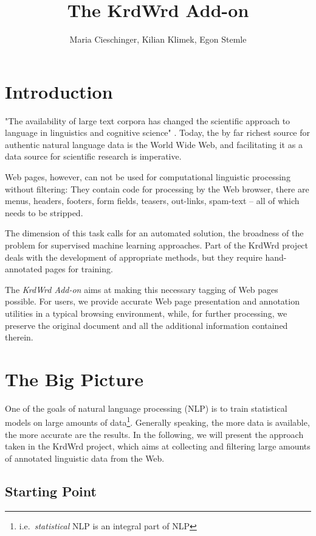 \documentclass[12pt]{article}
\title{The KrdWrd Add-on}
\author{Maria Cieschinger, Kilian Klimek, Egon Stemle}
\begin{document}
\maketitle


\section{Introduction}

"The availability of large text corpora has changed the scientific approach to language in linguistics and cognitive science" \cite{ManningSchuetze1999}.
Today, the by far richest source for authentic natural language data is the World Wide Web, and facilitating it as a data source for scientific research is imperative.

Web pages, however, can not be used for computational linguistic processing without filtering:
They contain code for processing by the Web browser, there are menus, headers, footers, form fields, teasers, out-links, spam-text -- all of which needs to be stripped.

The dimension of this task calls for an automated solution, the broadness of the problem for supervised machine learning approaches.
Part of the KrdWrd \cite{krdwrd.org} project deals with the development of appropriate methods, but they require hand-annotated pages for training.

The \textit{KrdWrd Add-on} aims at making this necessary tagging of Web pages possible.
For users, we provide accurate Web page presentation and annotation utilities in a typical browsing environment, while, for further processing, we preserve the original document and all the additional information contained therein.


\section{The Big Picture}

One of the goals of natural language processing (NLP) is to train statistical models on large amounts of data\footnote{i.e.~\textit{statistical} NLP is an integral part of NLP}. Generally speaking, the more data is available, the more accurate are the results. In the following, we will present the approach taken in the KrdWrd project, which aims at collecting and filtering large amounts of annotated linguistic data from the Web.


\subsection{Starting Point}
\end{document}
